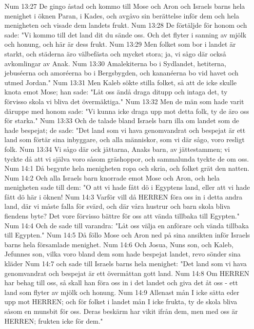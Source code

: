 Num 13:27  De gingo åstad och kommo till Mose och Aron och Israels barns hela menighet i öknen Paran, i Kades, och avgåvo sin berättelse inför dem och hela menigheten och visade dem landets frukt.
Num 13:28  De förtäljde för honom och sade: "Vi kommo till det land dit du sände oss. Och det flyter i sanning av mjölk och honung, och här är dess frukt.
Num 13:29  Men folket som bor i landet är starkt, och städerna äro välbefästa och mycket stora; ja, vi sågo där också avkomlingar av Anak.
Num 13:30  Amalekiterna bo i Sydlandet, hetiterna, jebuséerna och amoréerna bo i Bergsbygden, och kananéerna bo vid havet och utmed Jordan."
Num 13:31  Men Kaleb sökte stilla folket, så att de icke skulle knota emot Mose; han sade: "Låt oss ändå draga ditupp och intaga det, ty förvisso skola vi bliva det övermäktiga."
Num 13:32  Men de män som hade varit däruppe med honom sade: "Vi kunna icke draga upp mot detta folk, ty de äro oss för starka."
Num 13:33  Och de talade bland Israels barn illa om landet som de hade bespejat; de sade: "Det land som vi hava genomvandrat och bespejat är ett land som förtär sina inbyggare, och alla människor, som vi där sågo, voro resligt folk.
Num 13:34  Vi sågo där ock jättarna, Anaks barn, av jättestammen; vi tyckte då att vi själva voro såsom gräshoppor, och sammalunda tyckte de om oss.
Num 14:1  Då begynte hela menigheten ropa och skria, och folket grät den natten.
Num 14:2  Och alla Israels barn knorrade emot Mose och Aron, och hela menigheten sade till dem: "O att vi hade fått dö i Egyptens land, eller att vi hade fått dö här i öknen!
Num 14:3  Varför vill då HERREN föra oss in i detta andra land, där vi måste falla för svärd, och där våra hustrur och barn skola bliva fiendens byte? Det vore förvisso bättre för oss att vända tillbaka till Egypten."
Num 14:4  Och de sade till varandra: "Låt oss välja en anförare och vända tillbaka till Egypten."
Num 14:5  Då föllo Mose och Aron ned på sina ansikten inför Israels barns hela församlade menighet.
Num 14:6  Och Josua, Nuns son, och Kaleb, Jefunnes son, vilka voro bland dem som hade bespejat landet, revo sönder sina kläder
Num 14:7  och sade till Israels barns hela menighet: "Det land som vi hava genomvandrat och bespejat är ett övermåttan gott land.
Num 14:8  Om HERREN har behag till oss, så skall han föra oss in i det landet och giva det åt oss - ett land som flyter av mjölk och honung.
Num 14:9  Allenast mån I icke sätta eder upp mot HERREN; och för folket i landet mån I icke frukta, ty de skola bliva såsom en munsbit för oss. Deras beskärm har vikit ifrån dem, men med oss är HERREN; frukten icke för dem."
